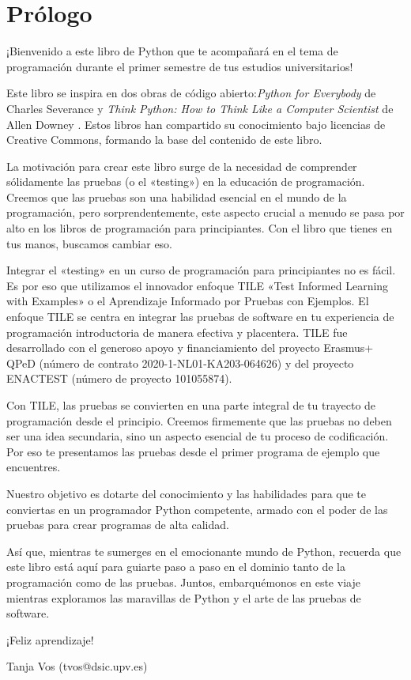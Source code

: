 
\chapter*{Prólogo}


¡Bienvenido a este libro de Python que te acompañará en el tema de programación durante el primer semestre de tus estudios universitarios!

Este libro se inspira en dos obras de código abierto:\textit{Python for Everybody} de Charles Severance \cite{severance2016python} y \textit{Think Python: How to Think Like a Computer Scientist} de Allen Downey \cite{downey2016thinkpython}. Estos libros han compartido su conocimiento bajo licencias de Creative Commons, formando la base del contenido de este libro.

La motivación para crear este libro surge de la necesidad de comprender sólidamente las pruebas (o el «testing») en la educación de programación. Creemos que las pruebas son una habilidad esencial en el mundo de la programación, pero sorprendentemente, este aspecto crucial a menudo se pasa por alto en los libros de programación para principiantes. Con el libro que tienes en tus manos, buscamos cambiar eso.

Integrar el «testing» en un curso de programación para principiantes no es fácil. Es por eso que utilizamos el innovador enfoque TILE \cite{10132188} «Test Informed Learning with Examples» o el Aprendizaje Informado por Pruebas con Ejemplos. El enfoque TILE se centra en integrar las pruebas de software en tu experiencia de programación introductoria de manera efectiva y placentera. TILE fue desarrollado con el generoso apoyo y financiamiento del proyecto Erasmus+ QPeD (número de contrato 2020-1-NL01-KA203-064626) y del proyecto ENACTEST (número de proyecto 101055874).

Con TILE, las pruebas se convierten en una parte integral de tu trayecto de programación desde el principio. Creemos firmemente que las pruebas no deben ser una idea secundaria, sino un aspecto esencial de tu proceso de codificación. Por eso te presentamos las pruebas desde el primer programa de ejemplo que encuentres.

Nuestro objetivo es dotarte del conocimiento y las habilidades para que te conviertas en un programador Python competente, armado con el poder de las pruebas para crear programas de alta calidad.

Así que, mientras te sumerges en el emocionante mundo de Python, recuerda que este libro está aquí para guiarte paso a paso en el dominio tanto de la programación como de las pruebas. Juntos, embarquémonos en este viaje mientras exploramos las maravillas de Python y el arte de las pruebas de software.

¡Feliz aprendizaje!

Tanja Vos
(tvos@dsic.upv.es)
